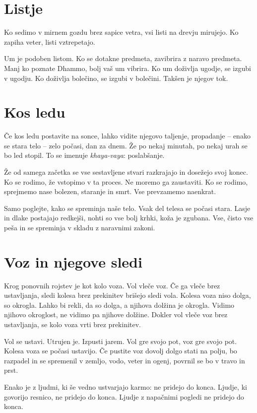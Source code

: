 \section{Listje}

Ko sedimo v mirnem gozdu brez sapice vetra, vsi listi na drevju mirujejo. Ko zapiha veter, listi vztrepetajo.

Um je podoben listom. Ko se dotakne predmeta, zavibrira z naravo predmeta. Manj ko poznate Dhammo, bolj vaš um vibrira. Ko um doživlja ugodje, se izgubi v ugodju. Ko doživlja bolečino, se izgubi v bolečini. Takšen je njegov tok.

\section{Kos ledu}

Če kos ledu postavite na sonce, lahko vidite njegovo taljenje, propadanje – enako se stara telo – zelo počasi, dan za dnem. Že po nekaj minutah, po nekaj urah se bo led stopil. To se imenuje \emph{khaya-vaya}: poslabšanje.

Že od samega začetka se vse sestavljene stvari razkrajajo in dosežejo svoj konec. Ko se rodimo, že vstopimo v ta proces. Ne moremo ga zaustaviti. Ko se rodimo, sprejmemo nase bolezen, staranje in smrt. Vse prevzamemo naenkrat.

Samo poglejte, kako se spreminja naše telo. Vsak del telesa se počasi stara. Lasje  in dlake postajajo redkejši, nohti so vse bolj krhki, koža je zgubana. Vse, čisto vse peša in se spreminja v skladu z naravnimi zakoni.

\section{Voz in njegove sledi}

Krog ponovnih rojstev je kot kolo voza. Vol vleče voz. Če ga vleče brez ustavljanja, sledi kolesa brez prekinitev brišejo sledi vola. Kolesa voza niso dolga, so okrogla. Lahko bi rekli, da so dolga, a njihova dolžina je okrogla. Vidimo njihovo okroglost, ne vidimo pa njihove dolžine. Dokler vol vleče voz brez ustavljanja, se kolo voza vrti brez prekinitev.

Vol se ustavi. Utrujen je. Izpusti jarem. Vol gre svojo pot, voz gre svojo pot. Kolesa voza se počasi ustavijo. Če pustite voz dovolj dolgo stati na polju, bo razpadel in se spremenil v zemljo, vodo, veter in ogenj, povrnil se bo v travo in prst.

Enako je z ljudmi, ki še vedno ustvarjajo karmo: ne pridejo do konca. Ljudje, ki govorijo resnico, ne pridejo do konca. Ljudje z napačnimi pogledi ne pridejo do konca.

